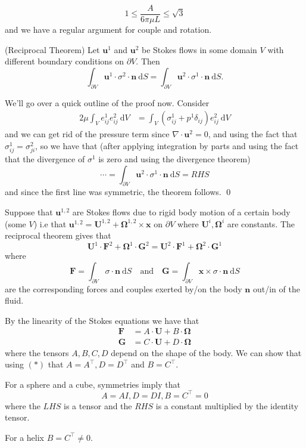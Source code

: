 \documentclass{article}
\begin{document}
\[
	1 \le \frac A{6\pi \mu L}\le \sqrt 3
\]
and we have a regular argument for couple and rotation.\par
\begin{theorem}
	(Reciprocal Theorem) Let $ \mathbf u^1 $ and $ \mathbf u^2 $ be Stokes flows in some domain $ V $ with different boundary conditions on $ \partial V $. Then
	\[
		\int_{\partial V}\mathbf u^1 \cdot\sigma^2 \cdot\mathbf n \ \mathrm dS = \int_{\partial V}\mathbf u^2 \cdot\sigma^1\cdot\mathbf n\ \mathrm dS.
	\]
\end{theorem}
\pf We'll go over a quick outline of the proof now. Consider
\begin{align*}
 2\mu \int_V e_{ij}^1e_{ij}^2 \ \mathrm dV &= \int_V(\sigma^1_{ij} + p^1\delta_{ij})e_{ij}^2 \ \mathrm dV
\end{align*}
and we can get rid of the pressure term since $ \nabla \cdot\mathbf u^2 = 0 $, and using the fact that $ \sigma^1_{ij} = \sigma^2_{ji} $, so we have that (after applying integration by parts and using the fact that the divergence of $ \sigma^1 $ is zero and using the divergence theorem)
\[
	\cdots = \int_{\partial V} \mathbf u^2 \cdot\sigma^1 \cdot\mathbf n \ \mathrm dS = RHS
\]
and since the first line was symmetric, the theorem follows. \qed
\begin{example}
	Suppose that $ \mathbf u^{1,2} $ are Stokes flows due to rigid body motion of a certain body (some $ V $) i.e that $ \mathbf u^{1,2} = \mathbf U^{1,2} +\boldsymbol \Omega^{1,2} \times \mathbf x $ on $ \partial V $ where $ \mathbf U^i,\boldsymbol\Omega^i $ are constants. The reciprocal theorem gives that
	\begin{equation}
		\mathbf U^1 \cdot\mathbf F^2 +\boldsymbol\Omega^1 \cdot\mathbf G^2 = \mathbf U^2 \cdot\mathbf F^1 + \boldsymbol\Omega^2 \cdot\mathbf G^1\tag{*} 
	\end{equation}
	where 
	\[
		\mathbf F = \int_{\partial V} \sigma \cdot\mathbf n \ \mathrm dS\quad \text{and}\quad \mathbf G = \int_{\partial V}\mathbf x \times \sigma \cdot\mathbf n \ \mathrm dS
	\]
	are the corresponding forces and couples exerted by/on the body $ \mathbf n $ out/in of the fluid.
	\par
	By the linearity of the Stokes equations we have that 
	\begin{align*}
		\mathbf F &= A\cdot\mathbf U + B\cdot\boldsymbol \Omega \\
		\mathbf G &= C\cdot\mathbf U + D\cdot\boldsymbol \Omega
	\end{align*}
	where the tensors $ A,B,C,D $ depend on the shape of the body. We can show that using $ (*) $ that $ A=A^\top, D=D^\top $ and $ B= C^\top $.\par
	For a sphere and a cube, symmetries imply that
	\[
	  A = AI, D=DI, B=C^\top = 0
	\]
	where the $ LHS $ is a tensor and the $ RHS $ is a constant multiplied by the identity tensor.\par
	For a helix $ B = C^\top \ne 0 $.
\end{example}
\end{document}
